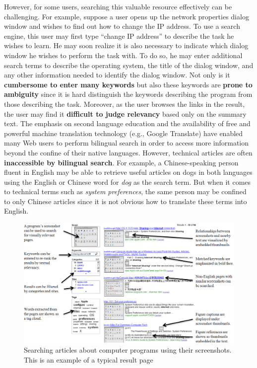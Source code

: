 \documentclass{www2010-submission}
\begin{document}
However, for some users, searching this valuable resource
effectively can be challenging. For example, suppose a user opens
up the network properties dialog window and wishes to find out how
to change the IP address. To use a search engine, this user may
first type ``change IP address'' to describe the task he wishes to
learn. He may soon realize it is also necessary to indicate which
dialog window he wishes to perform the task with. To do so, he may
enter additional search terms to describe the operating system,
the title of the dialog window, and any other information needed
to identify the dialog window. Not only is it \textbf{cumbersome
to enter many keywords} but also these keywords are \textbf{prone
to ambiguity} since it is hard distinguish the keywords describing
the program from those describing the task. Moreover, as the user
browses the links in the result, the user may find it
\textbf{difficult to judge relevancy} based only on the summary
text. The emphasis on second language education and the
availability of free and powerful machine translation technology
(e.g., Google Translate) have enabled many Web users to perform
bilingual search in order to access more information beyond the
confine of their native languages. However, technical articles are
often \textbf{inaccessible by bilingual search}. For example, a
Chinese-speaking person fluent in English may be able to retrieve
useful articles on dogs in both languages using the English or
Chinese word for \emph{dog} as the search term. But when it comes
to technical terms such as \emph{system preferences}, the same
person may be confined to only Chinese articles since it is not
obvious how to translate these terms into English.


\begin{figure}
\includegraphics[width=2\columnwidth]{figure/main_result.png}
\caption{Searching articles about computer programs using
their screenshots. This is an example of a typical
result page}
\label{fig:main_result}
\end{figure}
\end{document}
